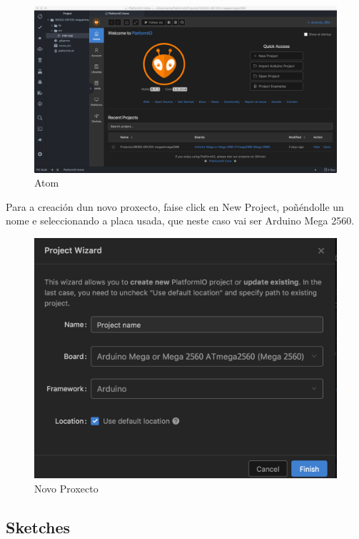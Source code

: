 \documentclass[11pt,twoside]{book}
\begin{document}
\begin{figure}[H]
	\begin{center}
		\includegraphics[width=15cm]{images/Atom.png}
	\end{center}
	\caption{Atom}
	\label{fig:Atom}
\end{figure}

Para a creación dun novo proxecto, faise click en New Project, poñéndolle un nome e seleccionando a placa usada, que neste caso vai ser Arduino Mega 2560.

\begin{figure}[H]
	\begin{center}
		\includegraphics[width=15cm]{images/NewProject.png}
	\end{center}
	\caption{Novo Proxecto}
	\label{fig:NewProject}
\end{figure}

\subsection{Sketches}
\end{document}
